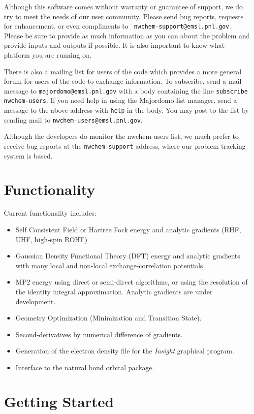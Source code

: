 Although this software comes without warranty or guarantee of support,
we do try to meet the needs of our user community.  Please send bug
reports, requests for enhancement, or even compliments to {\tt
nwchem-support@emsl.pnl.gov}.
Please be sure to provide as much information as you can about the
problem and provide inputs and outputs if possible.  It is also
important to know what platform you are running on.

There is also a mailing list for users of the code which provides a
more general forum for users of the code to exchange information.
To subscribe, send a mail message to {\tt majordomo@emsl.pnl.gov} with
a body containing the line {\tt subscribe nwchem-users}.  If you need
help in using the Majordomo list manager, send a message to the above
address with {\tt help} in the body.  You may post to the list by
sending mail to {\tt nwchem-users@emsl.pnl.gov}.

Although the developers do monitor the nwchem-users list, we much
prefer to receive bug reports at the {\tt nwchem-support} address,
where our problem tracking system is based.

\section{Functionality}

Current functionality includes:
\begin{itemize}
\item Self Consistent Field or Hartree Fock energy and analytic
  gradients (RHF, UHF, high-spin ROHF)
\item Gaussian Density Functional Theory (DFT) energy and analytic
  gradients with many local and
      non-local exchange-correlation potentials
\item MP2 energy using direct or semi-direct algorithms, or using the
  resolution of the identity integral approximation.  Analytic
  gradients are under development.
\item Geometry Optimization (Minimization and Transition State).
\item Second-derivatives by numerical difference of gradients.
\item Generation of the electron density file for the {\em Insight}
      graphical program.
\item Interface to the natural bond orbital package.
\end{itemize}

\section{Getting Started}
\label{sec:getstart}

